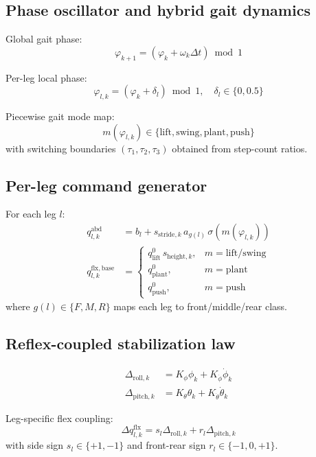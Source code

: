 \documentclass[11pt]{article}
\begin{document}
\subsection*{Phase oscillator and hybrid gait dynamics}

Global gait phase:
\begin{equation}
\varphi_{k+1} = (\varphi_k + \omega_k \Delta t)\bmod 1
\end{equation}

Per-leg local phase:
\begin{equation}
\varphi_{l,k} = (\varphi_k + \delta_l)\bmod 1,\quad
\delta_l\in\{0,0.5\}
\end{equation}

Piecewise gait mode map:
\[
m(\varphi_{l,k})\in\{\text{lift},\text{swing},\text{plant},\text{push}\}
\]
with switching boundaries $(\tau_1,\tau_2,\tau_3)$ obtained from step-count ratios.

\subsection*{Per-leg command generator}

For each leg $l$:
\begin{align}
q^{\mathrm{abd}}_{l,k} &= b_l + s_{\mathrm{stride},k}\,a_{g(l)}\,\sigma(m(\varphi_{l,k}))\\
q^{\mathrm{flx,base}}_{l,k} &=
\begin{cases}
q^0_{\mathrm{lift}}\,s_{\mathrm{height},k}, & m=\text{lift/swing}\\
q^0_{\mathrm{plant}}, & m=\text{plant}\\
q^0_{\mathrm{push}}, & m=\text{push}
\end{cases}
\end{align}
where $g(l)\in\{F,M,R\}$ maps each leg to front/middle/rear class.

\subsection*{Reflex-coupled stabilization law}

\begin{align}
\Delta_{\mathrm{roll},k} &= K_{\phi}\phi_k + K_{\dot{\phi}}\dot{\phi}_k\\
\Delta_{\mathrm{pitch},k} &= K_{\theta}\theta_k + K_{\dot{\theta}}\dot{\theta}_k
\end{align}

Leg-specific flex coupling:
\begin{equation}
\Delta q^{\mathrm{flx}}_{l,k}=s_l\Delta_{\mathrm{roll},k}+r_l\Delta_{\mathrm{pitch},k}
\end{equation}
with side sign $s_l\in\{+1,-1\}$ and front-rear sign $r_l\in\{-1,0,+1\}$.
\end{document}
